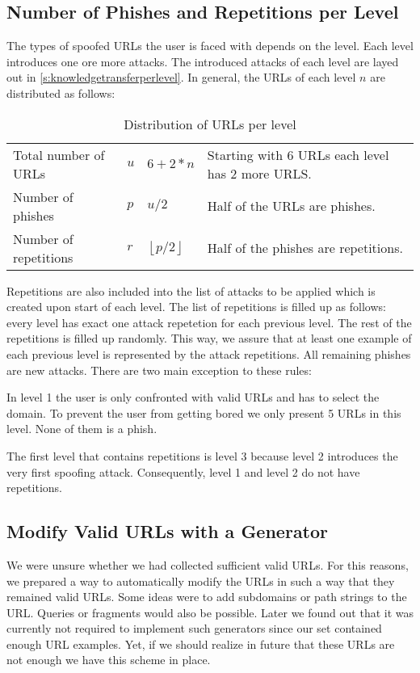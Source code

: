 \subsection{Number of Phishes and Repetitions per Level}
The types of spoofed URLs the user is faced with depends on the level.
Each level introduces one ore more attacks.
The introduced attacks of each level are layed out in \autoref{s:knowledgetransferperlevel}.
In general, the URLs of each level $n$ are distributed as follows:
\begin{table}[hHtbp]
\centering
\begin{tabular}{|llll|}
\hline
Total number of URLs&$u$&$6+2*n$&Starting with 6 URLs each level has 2 more URLS.\\
Number of phishes&$p$&$u/2$&Half of the URLs are phishes.\\
Number of repetitions&$r$&$\left\lfloor p/2 \right\rfloor$&Half of the phishes are repetitions.\\
\hline
\end{tabular}
\caption{Distribution of URLs per level}
\label{t:levelurls}
\end{table}
Repetitions are also included into the list of attacks to be applied which is created upon start of each level.
The list of repetitions is filled up as follows: every level has exact one attack repetetion for each previous level. The rest of the repetitions is filled up randomly. This way, we assure that at least one example of each previous level is represented by the attack repetitions. All remaining phishes are new attacks.
There are two main exception to these rules:
\begin{description}[leftmargin=0cm]
\item[Level 1:] In level 1 the user is only confronted with valid URLs and has to select the domain.
To prevent the user from getting bored we only present 5 URLs in this level.
None of them is a phish.
\item[Level 1+2:] The first level that contains repetitions is level 3 because level 2 introduces the very first spoofing attack. Consequently, level 1 and level 2 do not have repetitions.
\end{description}


\subsection{Modify Valid URLs with a Generator}
\label{s:apply_generator}
We were unsure whether we had collected sufficient valid URLs.
 For this reasons, we prepared a way to automatically modify the URLs in such a way that they remained valid URLs. 
Some ideas were to add subdomains or path strings to the URL. Queries or fragments would also  be possible. 
Later we found out that it was currently not required to implement such generators since our set contained enough URL examples. 
Yet, if we should realize in future that these URLs are not enough we have this scheme in place.
